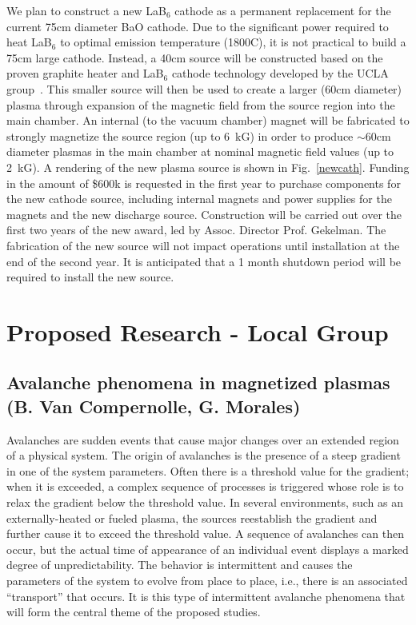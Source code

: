 \documentclass[11pt]{article}
\renewcommand{\cite}{\citep}
\begin{document}
We plan to construct a new LaB$_6$ cathode as a permanent replacement
for the current 75cm diameter BaO cathode.  Due to the significant power
required to heat LaB$_6$ to optimal emission temperature (1800C), it
is not practical to build a 75cm large cathode.  Instead, a 40cm source will
be constructed based on the proven graphite heater and LaB$_6$ cathode
technology developed by the UCLA group~\cite{cooper:2010}.  This smaller source will then
be used to create a larger (60cm diameter) plasma through expansion of
the magnetic field from the source region into the main chamber.  An
internal (to the vacuum chamber) magnet will be fabricated to strongly
magnetize the source region (up to 6~kG) in order to produce $\sim
60$cm diameter plasmas in the main chamber at nominal magnetic field
values (up to 2~kG).  A rendering of the new plasma source is shown in
Fig.~\ref{newcath}.  Funding in the amount of \$600k is
requested in the first year to purchase components for the new
cathode source, including internal magnets and power supplies for the
magnets and the new discharge source.  Construction  will be carried
out over the first two years of the new award, led by Assoc. Director
Prof. Gekelman.  The fabrication of the new source will not impact
operations until installation at the end of the second year.  It is
anticipated that a 1 month shutdown period will be required to install
the new source.  


\section{Proposed Research - Local Group}



\subsection{Avalanche phenomena in magnetized plasmas (B. Van Compernolle, G.
Morales)}

Avalanches are sudden events that cause major changes over an extended
region of a physical system. The origin of avalanches is the presence of
a steep gradient in one of the system parameters. Often there is a
threshold value for the gradient; when it is exceeded, a complex
sequence of processes is triggered whose role is to relax the gradient
below the threshold value. In several environments, such as an
externally-heated or fueled plasma, the sources reestablish the gradient
and further cause it to exceed the threshold value. A sequence of
avalanches can then occur, but the actual time of appearance of an
individual event displays a marked degree of unpredictability. The
behavior is intermittent and causes the parameters of the system to
evolve from place to place, i.e., there is an associated ``transport''
that occurs. It is this type of intermittent avalanche phenomena that
will form the central theme of the proposed studies.
\end{document}
